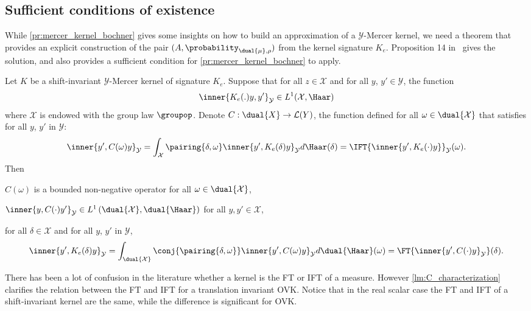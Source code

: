 \subsection{Sufficient conditions of existence}
\label{subsec:sufficient_conditions}
While \cref{pr:mercer_kernel_bochner} gives some insights on how to build an
approximation of a $\mathcal{Y}$-Mercer kernel, we need a theorem that provides
an explicit construction of the pair $(A, \probability_{\dual{\mu},\rho})$ from
the kernel signature $K_e$. Proposition 14 in~\citet{Carmeli2010} gives the
solution, and also provides a sufficient condition for
\cref{pr:mercer_kernel_bochner} to apply.
\begin{proposition}
    \label{pr:inverse_ovk_Fourier_decomposition}
    Let $K$ be a shift-invariant $\mathcal{Y}$-Mercer kernel of signature $K_e$. %
    Suppose that for all $z \in \mathcal{X}$ and for all $y$, $y'
    \in\mathcal{Y}$, the function
    \begin{dmath*}
        \inner{K_e(.)y,y'}_{\mathcal{Y}}\in L^1(\mathcal{X},\Haar)
    \end{dmath*}
    where $\mathcal{X}$ is endowed with the group law $\groupop$. Denote $C:
    \dual{X} \to \mathcal{L}(Y)$, the function defined for all $\omega \in
    \dual{\mathcal{X}}$ that satisfies for all $y$, $y'$ in $\mathcal{Y}$:
    \begin{dmath}\label{eq:CK0}
        \inner{y',C(\omega)y}_{\mathcal{Y}}= \int_{\mathcal{X}}
        \pairing{\delta, \omega}\inner{y',
        K_e(\delta)y}_{\mathcal{Y}}d\Haar(\delta) = \IFT{\inner{y',
        K_e(\cdot)y}}_{\mathcal{Y}}(\omega).
    \end{dmath}
    Then
    \begin{propenum}
        \item $C(\omega)$ is a bounded non-negative operator for all $\omega
        \in \dual{\mathcal{X}}$,
        \item $\inner{y, C(\cdot)y'}_{\mathcal{Y}}\in
        L^1\left(\dual{\mathcal{X}},\dual{\Haar}\right)$ for all
        $y,y'\in\mathcal{X}$,
        \item for all $\delta\in\mathcal{X}$ and for all $y$, $y'$ in
        $\mathcal{Y}$,
        \begin{dmath*}
            \inner{y', K_e(\delta)y}_{\mathcal{Y}}=
            \int_{\dual{\mathcal{X}}}\conj{\pairing{\delta,\omega}}\inner{y',
            C(\omega)y}_{\mathcal{Y}}d\dual{\Haar}(\omega) =\FT{\inner{y',
            C(\cdot)y}_{\mathcal{Y}}}(\delta).
        \end{dmath*}
    \end{propenum}
\end{proposition}
There has been a lot of confusion in the literature whether a kernel is the
\acl{FT} or \acl{IFT} of a measure. However \cref{lm:C_characterization}
clarifies the relation between the \acl{FT} and \acl{IFT} for a translation
invariant \acl{OVK}. Notice that in the real scalar case the \acl{FT} and
\acl{IFT} of a shift-invariant kernel are the same, while the difference is
significant for \acs{OVK}.
